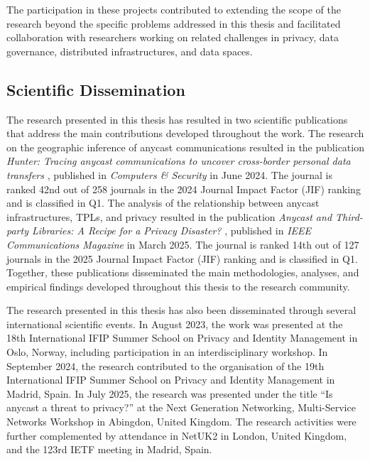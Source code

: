 The participation in these projects contributed to extending the scope of the research beyond the specific problems addressed in this thesis and facilitated collaboration with researchers working on related challenges in privacy, data governance, distributed infrastructures, and data spaces.

\subsection{Scientific Dissemination}
\label{sc:conclusion_dissemination}

The research presented in this thesis has resulted in two scientific publications that address the main contributions developed throughout the work. The research on the geographic inference of anycast communications resulted in the publication \emph{Hunter: Tracing anycast communications to uncover cross-border personal data transfers} \cite{Pascual2024Hunter:Transfers}, published in \emph{Computers \& Security} in June 2024. The journal is ranked 42nd out of 258 journals in the 2024 Journal Impact Factor (JIF) ranking and is classified in Q1. The analysis of the relationship between anycast infrastructures, TPLs, and privacy resulted in the publication \emph{Anycast and Third-party Libraries: A Recipe for a Privacy Disaster?} \cite{Pascual2025AnycastDisaster}, published in \emph{IEEE Communications Magazine} in March 2025. The journal is ranked 14th out of 127 journals in the 2025 Journal Impact Factor (JIF) ranking and is classified in Q1. Together, these publications disseminated the main methodologies, analyses, and empirical findings developed throughout this thesis to the research community. %

The research presented in this thesis has also been disseminated through several international scientific events. In August 2023, the work was presented at the 18th International IFIP Summer School on Privacy and Identity Management in Oslo, Norway, including participation in an interdisciplinary workshop. In September 2024, the research contributed to the organisation of the 19th International IFIP Summer School on Privacy and Identity Management in Madrid, Spain. In July 2025, the research was presented under the title ``Is anycast a threat to privacy?'' at the Next Generation Networking, Multi-Service Networks Workshop in Abingdon, United Kingdom. The research activities were further complemented by attendance in NetUK2 in London, United Kingdom, and the 123rd IETF meeting in Madrid, Spain.

